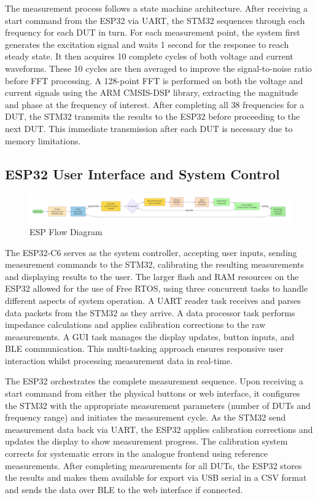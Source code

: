 The measurement process follows a state machine architecture. After receiving a start command from the ESP32 via UART, the STM32 sequences through each frequency for each \ac{DUT} in turn. For each measurement point, the system first generates the excitation signal and waits 1 second for the response to reach steady state. It then acquires 10 complete cycles of both voltage and current waveforms. These 10 cycles are then averaged to improve the signal-to-noise ratio before FFT processing. A 128-point FFT is performed on both the voltage and current signals using the ARM CMSIS-DSP library, extracting the magnitude and phase at the frequency of interest. After completing all 38 frequencies for a \ac{DUT}, the STM32 transmits the results to the ESP32 before proceeding to the next \ac{DUT}. This immediate transmission after each \ac{DUT} is necessary due to memory limitations.

\subsection{ESP32 User Interface and System Control}
\begin{figure}[H]
    \centering
    \includegraphics[width=\textwidth]{ESPFlowDiagram.png}
    \caption{ESP Flow Diagram}
    \label{fig:esp32_flow}
\end{figure}
The ESP32-C6 serves as the system controller, accepting user inputs, sending measurement commands to the STM32, calibrating the resulting measurements and displaying results to the user. The larger flash and RAM resources on the ESP32 allowed for the use of Free RTOS, using three concurrent tasks to handle different aspects of system operation. A UART reader task receives and parses data packets from the STM32 as they arrive. A data processor task performs impedance calculations and applies calibration corrections to the raw measurements. A GUI task manages the display updates, button inputs, and \ac{BLE} communication. This multi-tasking approach ensures responsive user interaction whilst processing measurement data in real-time.

The ESP32 orchestrates the complete measurement sequence. Upon receiving a start command from either the physical buttons or web interface, it configures the STM32 with the appropriate measurement parameters (number of \acp{DUT} and frequency range) and initiates the measurement cycle. As the STM32 send measurement data back via UART, the ESP32 applies calibration corrections and updates the display to show measurement progress. The calibration system corrects for systematic errors in the analogue frontend using reference measurements. After completing measurements for all \acp{DUT}, the ESP32 stores the results and makes them available for export via USB serial in a CSV format and sends the data over \ac{BLE} to the web interface if connected.

